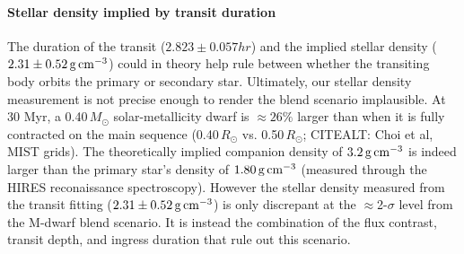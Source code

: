 \documentclass[12pt,modern,tighten]{aastex63}
\begin{document}
\paragraph{Stellar density implied by transit duration}
The duration of the transit ($2.823 \pm 0.057 hr$) and the implied
stellar density ($2.31 \pm 0.52\,{\rm g\,cm}^{-3}$) could in theory
help rule between whether the transiting body orbits the primary or
secondary star.  Ultimately, our stellar density measurement is not
precise enough to render the blend scenario implausible.  At 30 Myr, a
0.40\,$M_\odot$ solar-metallicity dwarf is $\approx 26\%$ larger than
when it is fully contracted on the main sequence (0.40\,$R_\odot$
vs{.} 0.50\,$R_\odot$; CITEALT: Choi et al, MIST grids).  The
theoretically implied companion density of $3.2\,{\rm g\,cm}^{-3}$ is
indeed larger than the primary star's density of $1.80\,{\rm
g\,cm}^{-3}$ (measured through the HIRES reconaissance spectroscopy).
However the stellar density measured from the transit fitting ($2.31
\pm 0.52\,{\rm g\,cm}^{-3}$) is only discrepant at the
$\approx$2-$\sigma$ level from the M-dwarf blend scenario.  It is
instead the combination of the flux contrast, transit depth, and
ingress duration that rule out this scenario.









% 


\listofchanges

\end{document}
